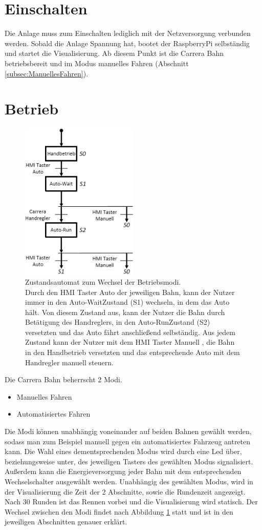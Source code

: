 \documentclass[a4paper, 11pt]{report}
\begin{document}
\section{Einschalten}
	Die Anlage muss zum Einschalten lediglich mit der Netzversorgung verbunden werden. Sobald die Anlage Spannung hat, bootet der RaspberryPi selbständig und startet die Visualisierung. Ab diesem Punkt ist die Carrera Bahn betriebsbereit und im Modus manuelles Fahren (Abschnitt \ref{subsec:ManuellesFahren}).
\section{Betrieb}
	\begin{figure}[ht]
		\centering
		\includegraphics[width=0.5\textwidth]{rec/modiAuswahl.png}
		\caption[Zustandsautomat zum Wechsel der Betriebsmodi]{Zustandsautomat zum Wechsel der Betriebsmodi.\\Durch den \glqq HMI Taster Auto \grqq der jeweiligen Bahn, kann der Nutzer immer in den \glqq Auto-Wait\grqq Zustand (S1) wechseln, in dem das Auto hält. Von diesem Zustand aus, kann der Nutzer die Bahn durch Betätigung des Handreglers, in den \glqq Auto-Run\grqq Zustand (S2) versetzten und das Auto fährt anschließend selbständig. Aus jedem Zustand kann der Nutzer mit dem \glqq HMI Taster Manuell \grqq, die Bahn in den Handbetrieb versetzten und das entsprechende Auto mit dem Handregler manuell steuern.}
		\label{img:Betriebsmodi}
	\end{figure}
	Die Carrera Bahn beherrscht 2 Modi.
	\begin{itemize}
		\item Manuelles Fahren
		\item Automatisiertes Fahren
	\end{itemize}
	Die Modi können unabhängig voneinander auf beiden Bahnen gewählt werden, sodass man zum Beispiel manuell gegen ein automatisiertes Fahrzeug antreten kann. Die Wahl eines dementsprechenden Modus wird durch eine Led über, beziehungsweise unter, des jeweiligen Tasters des gewählten Modus signalisiert. Außerdem kann die Energieversorgung jeder Bahn mit dem entsprechenden Wechselschalter ausgewählt werden. Unabhängig des gewählten Modus, wird in der Visualisierung die Zeit der 2 Abschnitte, sowie die Rundenzeit angezeigt. Nach 30 Runden ist das Rennen vorbei und die Visualisierung wird statisch.
	Der Wechsel zwischen den Modi findet nach Abbildung \ref{img:Betriebsmodi} statt und ist in den jeweiligen Abschnitten genauer erklärt.
\end{document}
